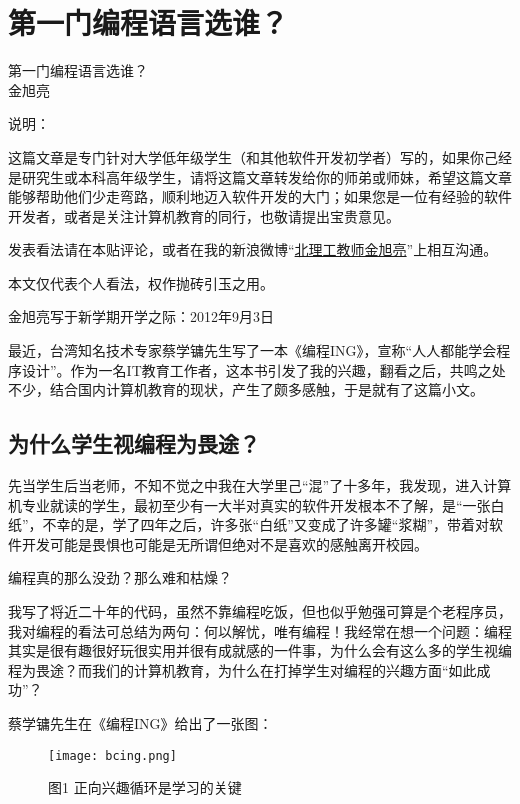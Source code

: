 \chapter{第一门编程语言选谁？}

\begin{center}
第一门编程语言选谁？\cite{first_programming_language} \\ 金旭亮
\end{center}

说明：

这篇文章是专门针对大学低年级学生（和其他软件开发初学者）写的，如果你己经是研究生或本科高年级学生，请将这篇文章转发给你的师弟或师妹，希望这篇文章能够帮助他们少走弯路，顺利地迈入软件开发的大门；如果您是一位有经验的软件开发者，或者是关注计算机教育的同行，也敬请提出宝贵意见。

发表看法请在本贴评论，或者在我的新浪微博“\href{http://weibo.com/jinxuliang}{北理工教师金旭亮}”上相互沟通。

本文仅代表个人看法，权作抛砖引玉之用。

\begin{flushright}
金旭亮写于新学期开学之际：2012年9月3日
\end{flushright}

最近，台湾知名技术专家蔡学镛先生写了一本《编程ING》，宣称“人人都能学会程序设计”。作为一名IT教育工作者，这本书引发了我的兴趣，翻看之后，共鸣之处不少，结合国内计算机教育的现状，产生了颇多感触，于是就有了这篇小文。


\section{为什么学生视编程为畏途？}

先当学生后当老师，不知不觉之中我在大学里己“混”了十多年，我发现，进入计算机专业就读的学生，最初至少有一大半对真实的软件开发根本不了解，是“一张白纸”，不幸的是，学了四年之后，许多张“白纸”又变成了许多罐“浆糊”，带着对软件开发可能是畏惧也可能是无所谓但绝对不是喜欢的感触离开校园。

编程真的那么没劲？那么难和枯燥？

我写了将近二十年的代码，虽然不靠编程吃饭，但也似乎勉强可算是个老程序员，我对编程的看法可总结为两句：何以解忧，唯有编程！我经常在想一个问题：编程其实是很有趣很好玩很实用并很有成就感的一件事，为什么会有这么多的学生视编程为畏途？而我们的计算机教育，为什么在打掉学生对编程的兴趣方面“如此成功”？

蔡学镛先生在《编程ING》给出了一张图：

\begin{figure}[!h]
\centering
\texttt{[image: bcing.png]}
\caption{图1 正向兴趣循环是学习的关键}
\label{bcing}
\end{figure}


